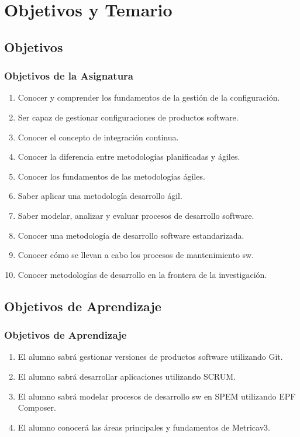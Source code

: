 \documentclass[animated,a4paper,slidestop,xcolor=pst,blue]{beamer}
\begin{document}
\section{Objetivos y Temario}

\subsection{Objetivos}

\begin{frame}[c]
	\frametitle{Objetivos de la Asignatura}
    \begin{enumerate}[<+->]
        \item Conocer y comprender los fundamentos de la gestión de la configuración.
        \item Ser capaz de gestionar configuraciones de productos software.
        \item Conocer el concepto de integración continua.
        \item Conocer la diferencia entre metodologías planificadas y ágiles.
        \item Conocer los fundamentos de las metodologías ágiles.
        \item Saber aplicar una metodología desarrollo ágil.
        \item Saber modelar, analizar y evaluar procesos de desarrollo software.
        \item Conocer una metodología de desarrollo software estandarizada.
        \item Conocer cómo se llevan a cabo los procesos de mantenimiento sw.
        \item Conocer metodologías de desarrollo en la frontera de la investigación.
	 \end{enumerate}
\end{frame}

\subsection{Objetivos de Aprendizaje}

\begin{frame}[c]
	\frametitle{Objetivos de Aprendizaje}
    	\begin{enumerate}[<+->]
            \item El alumno sabrá gestionar versiones de productos software utilizando \alert{Git}.
            \item El alumno sabrá desarrollar aplicaciones utilizando \alert{SCRUM}.
            \item El alumno sabrá modelar procesos de desarrollo sw en \alert{SPEM} utilizando \alert{EPF Composer}.
            \item El alumno conocerá las áreas principales y fundamentos de \alert{Metricav3}.
		\end{enumerate}
\end{frame}
\end{document}
